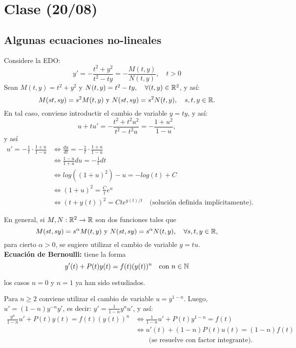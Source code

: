 
\section{Clase (20/08)}
\subsection{Algunas ecuaciones no-lineales}

\begin{eg}
	Considere la EDO:
	\[
	y' = -\frac{t^2 + y^2}{t^2 - ty} = -\frac{M(t,y)}{N(t,y)}, \quad t > 0
	\]
	Sean $M(t,y) =  t^2 + y^2$ y $N(t,y) = t^2 - ty, \quad \forall (t,y) \in \mathbb{R}^2$, y así:
	\[
	M(st,sy) = s^2 M(t,y) \text{ y } N(st,sy) = s^2 N(t,y), \quad s,t,y \in \mathbb{R}.
	\]
	En tal caso, conviene introductir el cambio de variable $y = ty$, y así:
	\[
	u+tu' = -\frac{t^2+t^2u^2}{t^2-t^2u} = - \frac{1+u^2}{1-u},
	\]
	y así
	\begin{align*}
		u' = -\frac{1}{t}\cdot \frac{1+u}{1-u} &\iff \frac{du}{dt} = -\frac{1}{t}\cdot \frac{1+u}{1-u} \\
		& \iff \frac{1-u}{1+u} du = - \frac{1}{t} dt \\
		& \iff log ((1+u)^2)-u = -log (t) + C \\
		& \iff (1+u)^2 = \frac{C}{t} e^u \\
		& \iff (t + y(t))^2 = Ct e^{y(t)/t} \quad \text{(solución definida implícitamente)}
	.\end{align*}
\end{eg}
	\noindent En general, si $M,N : \mathbb{R}^2 \to \mathbb{R}$ son dos funciones tales que
	\[
	M(st,sy)= s^{\alpha} M(t,y) \text{ y } N(st,sy) = s^{\alpha} N(t,y),\quad \forall s,t,y\in \mathbb{R},
	\]
	\noindent para cierto $\alpha> 0$, se sugiere utilizar el cambio de variable $y = tu$.\\

	\noindent \textbf{Ecuación de Bernoulli:} tiene la forma
	\[
	y'(t) + P(t)y(t) = f(t)(y(t))^n \quad \text{con } n \in \mathbb{N}
	\]
	\begin{note}
		los casos $n=0$ y $n=1$ ya han sido estudiados.
	\end{note}

	\noindent Para $n\geq 2$ conviene utilizar el cambio de variable $u = y^{1-n}$. Luego, $u' = (1-n)y^{-n}y'$, es decir: $y' = \frac{1}{1-n} y^n u'$, y así:
	\begin{align*}
		\frac{y^n}{1-n} u' + P(t)y(t) = f(t)(y(t))^n & \iff \frac{1}{1-n} u' + P(t) y^{1-n} = f(t) \\
		& \iff u'(t) + (1-n) P(t) u(t) = (1-n) f(t) \\ 
		& \qquad \text{(se resuelve con factor integrante)}
	.\end{align*}

